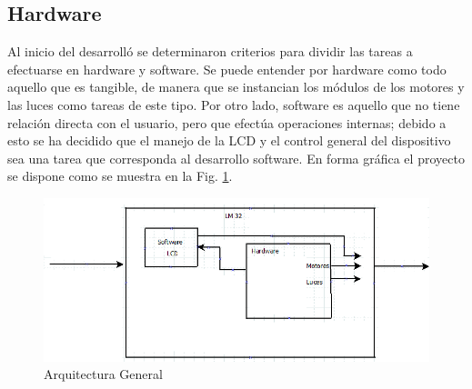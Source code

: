 \documentclass[twocolumn]{IEEEtran}
\begin{document}
\subsection{Hardware}
\noindent
Al inicio del desarrolló se determinaron  criterios para dividir las tareas a efectuarse en hardware y software.  Se puede entender por hardware como todo aquello que es tangible, de manera que se instancian los módulos de los motores y las luces como tareas de este tipo. Por otro lado, software es aquello que no tiene relación directa con el usuario, pero que efectúa operaciones internas; debido a esto se ha decidido que el manejo de la LCD y el control general del dispositivo sea una tarea que corresponda al desarrollo software. En forma gráfica el proyecto se dispone como se muestra en la Fig. \ref{fig2}.
\begin{figure}[H]
	\centering
		\includegraphics[scale=0.3]{architecture.png}
	\caption{Arquitectura General}
	\label{fig2}
\end{figure}
\end{document}
